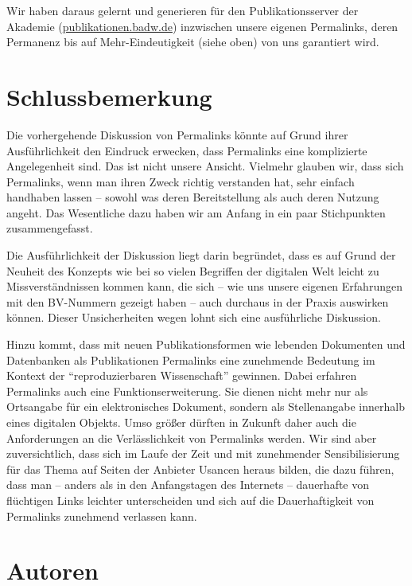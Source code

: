 \documentclass[12pt, a4paper]{article}
\begin{document}
Wir haben daraus gelernt und generieren für den Publikationsserver der
Akademie (\href{http://publikationen.badw.de/}{publikationen.badw.de})
inzwischen unsere eigenen Permalinks, deren Permanenz bis auf
Mehr-Eindeutigkeit (siehe oben) von uns garantiert wird.


\section{Schlussbemerkung}
\label{schlussbemerkung}

Die vorhergehende Diskussion von Permalinks könnte auf Grund ihrer
Ausführlichkeit den Eindruck erwecken, dass Permalinks eine
komplizierte Angelegenheit sind. Das ist nicht unsere
Ansicht. Vielmehr glauben wir, dass sich Permalinks, wenn man ihren
Zweck richtig verstanden hat, sehr einfach handhaben lassen --
sowohl was deren Bereitstellung als auch deren Nutzung angeht. Das
Wesentliche dazu haben wir am Anfang in ein paar Stichpunkten
zusammengefasst.

Die Ausführlichkeit der Diskussion liegt darin begründet, dass es auf
Grund der Neuheit des Konzepts wie bei so vielen Begriffen der digitalen
Welt leicht zu Missverständnissen kommen kann, die sich -- wie uns
unsere eigenen Erfahrungen mit den BV-Nummern gezeigt haben -- auch
durchaus in der Praxis auswirken können. Dieser Unsicherheiten wegen
lohnt sich eine ausführliche Diskussion.

Hinzu kommt, dass mit neuen Publikationsformen wie lebenden Dokumenten
und Datenbanken als Publikationen Permalinks eine zunehmende Bedeutung
im Kontext der "`reproduzierbaren Wissenschaft"' gewinnen. Dabei
erfahren Permalinks auch eine Funktionserweiterung. Sie dienen nicht
mehr nur als Ortsangabe für ein elektronisches Dokument, sondern als
Stellenangabe innerhalb eines digitalen Objekts. Umso größer dürften
in Zukunft daher auch die Anforderungen an die Verlässlichkeit von
Permalinks werden. Wir sind aber zuversichtlich, dass sich im Laufe
der Zeit und mit zunehmender Sensibilisierung für das Thema auf Seiten
der Anbieter Usancen heraus bilden, die dazu führen, dass man --
anders als in den Anfangstagen des Internets -- dauerhafte von
flüchtigen Links leichter unterscheiden und sich auf die
Dauerhaftigkeit von Permalinks zunehmend verlassen kann.

\section{Autoren}
\end{document}
